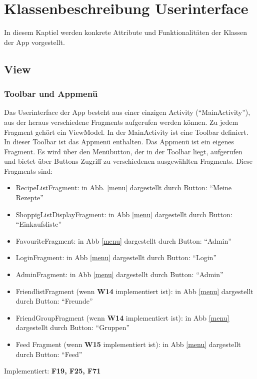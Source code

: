 \chapter{Klassenbeschreibung Userinterface}

In diesem Kaptiel werden konkrete Attribute und Funktionalitäten der Klassen der App vorgestellt.

\section{View}

\subsection{Toolbar und Appmenü}

Das Userinterface der App besteht aus einer einzigen Activity ("`MainActivity"'), aus der heraus verschiedene Fragments aufgerufen werden können. Zu jedem Fragment gehört ein ViewModel.
In der MainActivity ist eine Toolbar definiert. In dieser Toolbar ist das Appmenü enthalten. Das Appmenü ist ein eigenes Fragment. Es wird über den Menübutton, der in der Toolbar liegt, aufgerufen und bietet über Buttons Zugriff zu verschiedenen ausgewählten Fragments.
Diese Fragments sind:
\begin{itemize}[nosep]
	\item RecipeListFragment: in Abb. \ref{menu} dargestellt durch Button: "`Meine Rezepte"'
	\item ShoppigListDisplayFragment: in Abb \ref{menu} dargestellt durch Button: "`Einkaufsliste"'
	\item FavouriteFragment: in Abb \ref{menu} dargestellt durch Button: "`Admin"'
	\item LoginFragment: in Abb \ref{menu} dargestellt durch Button: "`Login"'
	\item AdminFragment: in Abb \ref{menu} dargestellt durch Button: "`Admin"'
	\item FriendlistFragment (wenn \textbf{W14} implementiert ist): in Abb \ref{menu} dargestellt durch Button: "`Freunde"'
	\item FriendGroupFragment (wenn \textbf{W14} implementiert ist): in Abb \ref{menu} dargestellt durch Button: "`Gruppen"'
	\item Feed Fragment (wenn \textbf{W15} implementiert ist): in Abb \ref{menu} dargestellt durch Button: "`Feed"'
\end{itemize}

Implementiert: \textbf{F19, F25, F71}

